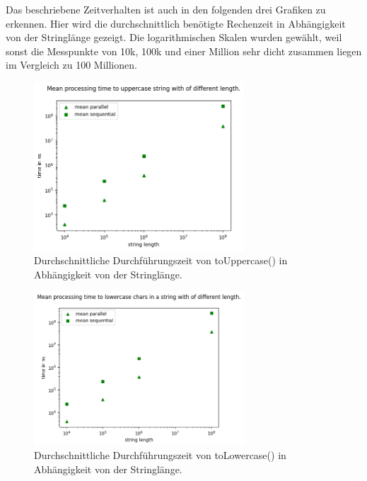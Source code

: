 \documentclass[plainarticle,zihtitle,german,final,hyperref,utf8]{zihpub}
\begin{document}
Das beschriebene Zeitverhalten ist auch in den folgenden drei Grafiken zu erkennen.
Hier wird die durchschnittlich benötigte Rechenzeit in Abhängigkeit von der Stringlänge gezeigt.
Die logarithmischen Skalen wurden gewählt, weil sonst die Messpunkte von 10k, 100k und einer Million sehr dicht zusammen liegen im Vergleich zu 100 Millionen.


\begin{figure}[h]
	\begin{center}
		\includegraphics[width=0.7\textwidth]{images/complex_upper.png}
		\caption{Durchschnittliche Durchführungszeit von toUppercase() in Abhängigkeit von der Stringlänge.}
		\label{fig:mean_upper}
	\end{center}
\end{figure}

\begin{figure}[h]
	\begin{center}
		\includegraphics[width=0.7\textwidth]{images/complex_lower.png}
		\caption{Durchschnittliche Durchführungszeit von toLowercase() in Abhängigkeit von der Stringlänge.}
		\label{fig:mean_upper}
	\end{center}
\end{figure}
\end{document}
